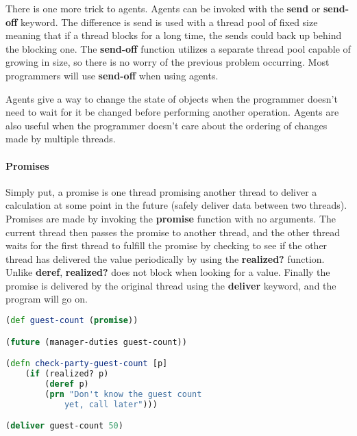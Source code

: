    There is one more trick to agents. Agents can be invoked with the \textbf{send} or \textbf{send-off} keyword. The difference is send is used with a thread pool of fixed size meaning that if a thread blocks for a long time, the sends could back up behind the blocking one. The \textbf{send-off} function utilizes a separate thread pool capable of growing in size, so there is no worry of the previous problem occurring. Most programmers will use \textbf{send-off} when using agents.
    
    Agents give a way to change the state of objects when the programmer doesn't need to wait for it be changed before performing another operation. Agents are also useful when the programmer doesn't care about the ordering of changes made by multiple threads.   
    
    \paragraph{Promises}
    
    Simply put, a promise is one thread promising another thread to deliver a calculation at some point in the future (safely deliver data between two threads). Promises are made by invoking the \textbf{promise} function with no arguments. The current thread then passes the promise to another thread, and the other thread waits for the first thread to fulfill the promise by checking to see if the other thread has delivered the value periodically by using the \textbf{realized?} function. Unlike \textbf{deref}, \textbf{realized?} does not block when looking for a value. Finally the promise is delivered by the original thread using the \textbf{deliver} keyword, and the program will go on.
    \cite{UnderstandingClojureConcurrency_Website_BlakeSmith}
    \cite{MultiCoreParallelizationClojure_JournalArticle_Kraus}
    \cite{ClojureFourConcurrencyModels_Website_Galpin}
    \cite{Clojure_ModularProgrammingFunctionalAbstract_JournalArticle_Dhiman}
    
    \begin{lstlisting}[language=clojure]
(def guest-count (promise))

(future (manager-duties guest-count))

(defn check-party-guest-count [p]
    (if (realized? p)
	    (deref p)
	    (prn "Don't know the guest count
	        yet, call later")))

(deliver guest-count 50)    
    \end{lstlisting}

